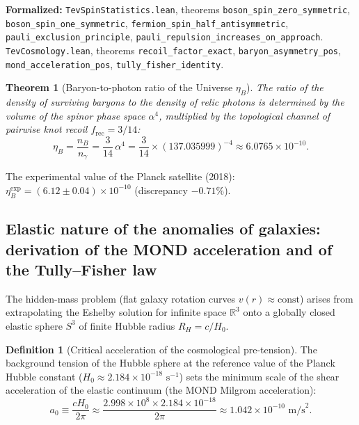 \documentclass[11pt,a4paper]{article}
\newtheorem{theorem}{Theorem}
\theoremstyle{definition}
\newtheorem{definition}{Definition}
\theoremstyle{remark}
\begin{document}
\noindent\small\textbf{Formalized:} \texttt{TevSpinStatistics.lean}, theorems \texttt{boson_spin_zero_symmetric}, \texttt{boson_spin_one_symmetric}, \texttt{fermion_spin_half_antisymmetric}, \texttt{pauli_exclusion_principle}, \texttt{pauli_repulsion_increases_on_approach}.
\texttt{TevCosmology.lean}, theorems \texttt{recoil_factor_exact}, \texttt{baryon_asymmetry_pos}, \texttt{mond_acceleration_pos}, \texttt{tully_fisher_identity}.

\begin{theorem}[Baryon-to-photon ratio of the Universe $\eta_B$]
\label{thm:baryon_asymmetry_exact}
The ratio of the density of surviving baryons to the density of relic photons is determined by the volume of the spinor phase space $\alpha^4$, multiplied by the topological channel of pairwise knot recoil $f_{\mathrm{rec}} = 3/14$:
\begin{equation}
\eta_B = \frac{n_B}{n_\gamma} = \frac{3}{14} \, \alpha^4 = \frac{3}{14} \times (137.035999)^{-4} \approx 6.0765 \times 10^{-10}.
\label{eq:baryon_asymmetry_formula}
\end{equation}
\end{theorem}
The experimental value of the Planck satellite (2018): $\eta_B^{\mathrm{exp}} = (6.12 \pm 0.04) \times 10^{-10}$ (discrepancy $-0.71\%$).

\subsection{Elastic nature of the anomalies of galaxies: derivation of the MOND acceleration and of the Tully--Fisher law}

The hidden-mass problem (flat galaxy rotation curves $v(r) \approx \text{const}$) arises from extrapolating the Eshelby solution for infinite space $\mathbb{R}^3$ onto a globally closed elastic sphere $S^3$ of finite Hubble radius $R_H = c / H_0$.

\begin{definition}[Critical acceleration of the cosmological pre-tension]
The background tension of the Hubble sphere at the reference value of the Planck Hubble constant ($H_0 \approx 2.184 \times 10^{-18}\text{ s}^{-1}$) sets the minimum scale of the shear acceleration of the elastic continuum (the MOND Milgrom acceleration):
\begin{equation}
a_0 \equiv \frac{c H_0}{2\pi} \approx \frac{2.998 \times 10^8 \times 2.184 \times 10^{-18}}{2\pi} \approx 1.042 \times 10^{-10}\text{ m/s}^2.
\label{eq:mond_acceleration_def}
\end{equation}
\end{definition}
\end{document}
